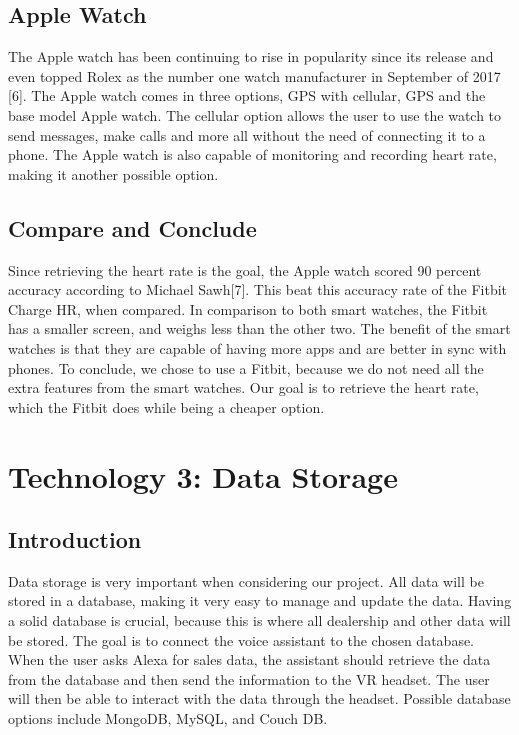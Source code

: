 \documentclass[onecolumn, draftclsnofoot,10pt, compsoc]{IEEEtran}
\begin{document}
	\subsection{Apple Watch}
	
		The Apple watch has been continuing to rise in popularity since its release and even topped Rolex as the number one watch manufacturer in September of 2017 [6]. The Apple watch comes in three options, GPS with cellular, GPS and the base model Apple watch. The 
		cellular option allows the user to use the watch to send messages, make calls and more all without the need of connecting it to a phone. The Apple watch is also capable of monitoring and recording heart rate, making it another possible option.
		
	\subsection{Compare and Conclude}
	
		Since retrieving the heart rate is the goal, the Apple watch scored 90 percent accuracy according to Michael Sawh[7]. This beat this accuracy rate of the Fitbit Charge HR, when compared. In comparison to both smart watches, the Fitbit has a smaller screen, and weighs 
		less than the other two. The benefit of the smart watches is that they are capable of having more apps and are better in sync with phones. To conclude, we chose to use a Fitbit, because we do not need all the extra features from the smart watches. Our goal is to 
		retrieve the heart rate, which the Fitbit does while being a cheaper option.
	
	
\section{Technology 3: Data Storage}

	\subsection{Introduction}
	
		Data storage is very important when considering our project. All data will be stored in a database, making it very easy to manage and update the data. Having a solid database is crucial, because this is where all dealership and other data will be stored. 
		The goal is to connect the voice assistant to the chosen database. When the user asks Alexa for sales data, the assistant should retrieve the data from the database and then send the information to the VR headset. The user will then be able to interact with 
		the data through the headset. Possible database options include MongoDB, MySQL, and Couch DB. 
	
\end{document}
